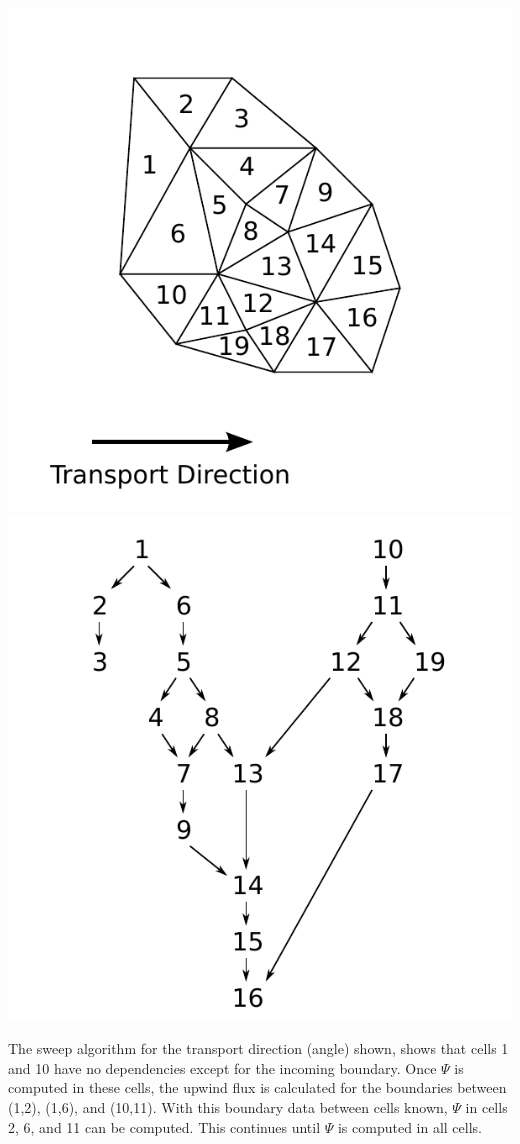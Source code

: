 \documentclass[12pt,letterpaper]{article}
\begin{document}
\includegraphics[scale=0.75]{grid2d.pdf}
\includegraphics[scale=0.75]{dag.pdf}

The sweep algorithm for the transport direction (angle) shown, shows that cells 1 and 10 have no dependencies except for the incoming boundary.
Once $\Psi$ is computed in these cells, the upwind flux is calculated for the boundaries between (1,2), (1,6), and (10,11).
With this boundary data between cells known, $\Psi$ in cells 2, 6, and 11 can be computed.
This continues until $\Psi$ is computed in all cells.
\end{document}
